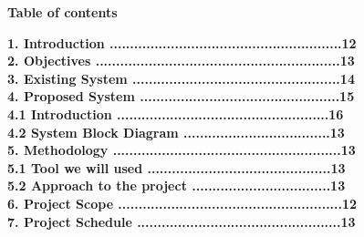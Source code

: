\documentclass[a4paper]{article}
\begin{document}
\newpage
{


	\begin{center}
		\textbf{ \huge{Table of contents}}
		\vspace{40pt}
	\end{center}


	\vspace{20pt}

\Large{

	\textbf{1. Introduction	.........................................................12 \\ }
	\vspace{20pt}
	\textbf{2. Objectives  ............................................................13\\}
	\vspace{20pt}
	\textbf{3. Existing System ...................................................14\\}
	\vspace{20pt}
	\textbf{4. Proposed System .................................................15\\}
	\vspace{20pt}
	\hspace{15pt}\textbf{4.1 Introduction ....................................................16 \\}
	\vspace{20pt}
	\hspace{15pt}\textbf{4.2 System Block Diagram ....................................13 \\}
	\vspace{20pt}
	\textbf{5. Methodology ........................................................13 \\}
	\vspace{20pt}
	\hspace{15pt}\textbf{5.1 Tool we will used .............................................13 \\}
	\vspace{20pt}
	\hspace{15pt}\textbf{5.2 Approach to the project ..................................13  \\}
	\vspace{20pt}
	\textbf{6. Project Scope .......................................................12 \\}
	\vspace{20pt}
	\textbf{7. Project Schedule ..................................................13}		
	\vspace{20pt}

}

}
\end{document}
